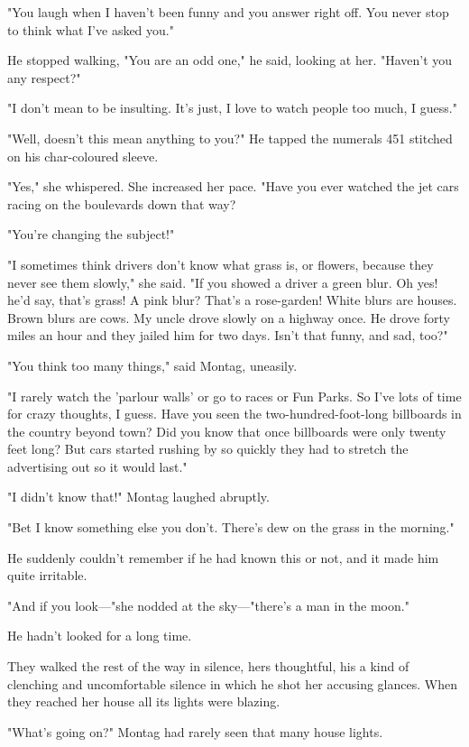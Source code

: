 \documentclass[10pt,a4paper]{article}
\begin{document}
"You laugh when I haven't been funny and you 
answer right off. You never stop to think what I've asked 
you." 

He stopped walking, "You are an odd one," he said, 
looking at her. "Haven't you any respect?" 

"I don't mean to be insulting. It's just, I love to watch 
people too much, I guess." 

"Well, doesn't this mean anything to you?" He tapped 
the numerals 451 stitched on his char-coloured sleeve. 

"Yes," she whispered. She increased her pace. "Have 
you ever watched the jet cars racing on the boulevards 
down that way? 

"You're changing the subject!" 

"I sometimes think drivers don't know what grass is, 
or flowers, because they never see them slowly," she said. "If 
you showed a driver a green blur. Oh yes! he'd say, that's 
grass! A pink blur? That's a rose-garden! White blurs are 
houses. Brown blurs are cows. My uncle drove slowly on a 
highway once. He drove forty miles an hour and they jailed 
him for two days. Isn't that funny, and sad, too?" 

"You think too many things," said Montag, uneasily. 

"I rarely watch the 'parlour walls' or go to races or 
Fun Parks. So I've lots of time for crazy thoughts, I guess. 
Have you seen the two-hundred-foot-long billboards in the 
country beyond town? Did you know that once billboards 
were only twenty feet long? But cars started rushing by so 
quickly they had to stretch the advertising out so it would 
last." 

"I didn't know that!" Montag laughed abruptly. 

"Bet I know something else you don't. There's dew on 
the grass in the morning." 

He suddenly couldn't remember if he had known this 
or not, and it made him quite irritable. 

"And if you look—"she nodded at the sky—"there's a 
man in the moon." 

He hadn't looked for a long time. 

They walked the rest of the way in silence, hers 
thoughtful, his a kind of clenching and uncomfortable 
silence in which he shot her accusing glances. When they 
reached her house all its lights were blazing. 

"What's going on?" Montag had rarely seen that 
many house lights. 
\end{document}

